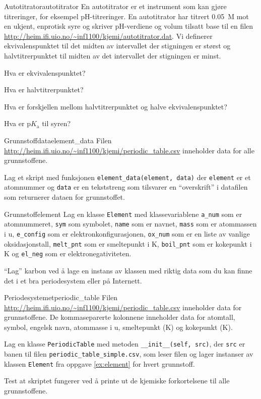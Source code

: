 \exercisechapter

\begin{exercise}{Autotitrator}{autotitrator}
	En autotitrator er et instrument som kan gjøre titreringer, for eksempel pH-titreringer. En autotitrator har titrert \SI{0,05}{M}  mot en ukjent, enprotisk syre og skriver pH-verdiene og volum tilsatt base til en filen \url{http://heim.ifi.uio.no/~inf1100/kjemi/autotitrator.dat}. Vi definerer ekvivalenspunktet til det midten av intervallet der stigningen er størst og halvtitrerpunktet til midten av det intervallet der stigningen er minst.
	
	\subexercise Hva er ekvivalenspunktet?
	
	\subexercise Hva er halvtitrerpunktet?
	
	\subexercise Hva er forskjellen mellom halvtitrerpunktet og halve ekvivalenspunktet?
	
	\subexercise Hva er $\mathrm{p}K_\mathrm{a}$ til syren?
\end{exercise}

\begin{exercise}{Grunnstoffdata}{element_data}
	Filen \url{http://heim.ifi.uio.no/~inf1100/kjemi/periodic_table.csv} inneholder data for alle grunnstoffene. 
	
	Lag et skript med funksjonen \texttt{element_data(element, data)} der \texttt{element} er et atomnummer og \texttt{data} er en tekststreng som tilsvarer en ``overskrift'' i datafilen som returnerer dataen for grunnstoffet.
\end{exercise}

\exercisechapter

\begin{exercise}{Grunnstoff}{element}
	Lag en klasse \texttt{Element} med klassevariablene
	\texttt{a_num} som er atomnummeret, \texttt{sym} som symbolet, \texttt{name} som er navnet, \texttt{mass} som er atommassen i u, \texttt{e_config} som er elektronkonfigurasjonen, \texttt{ox_num} som er en liste av vanlige oksidasjonstall, \texttt{melt_pnt} som er smeltepunkt i K, \texttt{boil_pnt} som er kokepunkt i K  og \texttt{el_neg} som er elektronegativiteten. 
	
	``Lag'' karbon ved å lage en instans av klassen med riktig data som du kan finne det i et bra periodesystem eller på Internett.
\end{exercise}

\begin{exercise}{Periodesystemet}{periodic_table}
	Filen \url{http://heim.ifi.uio.no/~inf1100/kjemi/periodic_table.csv}
	inneholder data for grunnstoffene. De kommaseparerte kolonnene inneholder data for atomtall, symbol, engelsk navn, atommasse i u, smeltepunkt (K) og kokepunkt (K).
	
	\subexercise Lag en klasse \texttt{PeriodicTable} med metoden \texttt{__init__(self, src)}, der \texttt{src} er banen til filen \texttt{periodic_table_simple.csv}, som leser filen og lager instanser av klassen \texttt{Element} fra oppgave \ref{ex:element} for hvert grunnstoff.
	
	\subexercise Test at skriptet fungerer ved å printe ut de kjemiske forkortelsene til alle grunnstoffene.
\end{exercise}

